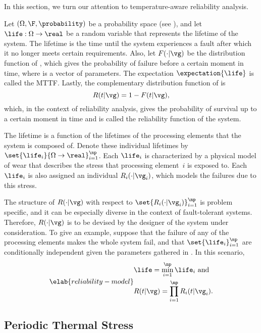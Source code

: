 In this section, we turn our attention to temperature-aware reliability
analysis.

Let $(\Omega, \F, \probability)$ be a probability space (see
), and let $\life: \Omega \to \real$ be a random
variable that represents the lifetime of the system. The lifetime is the time
until the system experiences a fault after which it no longer meets certain
requirements. Also, let $F(\cdot | \vg)$ be the distribution function of \life,
which gives the probability of failure before a certain moment in time, where
\vg is a vector of parameters. The expectation $\expectation{\life}$ is called
the \ac{MTTF}. Lastly, the complementary distribution function of \life is
\[
  R(t | \vg) = 1 - F(t | \vg),
\]
which, in the context of reliability analysis, gives the probability of survival
up to a certain moment in time and is called the reliability function of the
system.

The lifetime \life is a function of the lifetimes of the \np processing elements
that the system is composed of. Denote these individual lifetimes by
$\set{\life_i}{\Omega \to \real}_{i = 1}^\np$. Each $\life_i$ is characterized
by a physical model of wear \cite{jedec2016} that describes the stress that
processing element~$i$ is exposed to. Each $\life_i$ is also assigned an
individual $R_i(\cdot | \vg_i)$, which models the failures due to this stress.

The structure of $R(\cdot | \vg)$ with respect to $\set{R_i(\cdot | \vg_i)}_{i =
1}^\np$ is problem specific, and it can be especially diverse in the context of
fault-tolerant systems. Therefore, $R(\cdot | \vg)$ is to be devised by the
designer of the system under consideration. To give an example, suppose that the
failure of any of the \np processing elements makes the whole system fail, and
that $\set{\life_i}_{i = 1}^\np$ are conditionally independent given the
parameters gathered in \vg. In this scenario,
\begin{equation} \elab{reliability-model}
  \begin{split}
    & \life = \min_{i = 1}^\np \life_i \text{ and} \\
    & R(t | \vg) = \prod_{i = 1}^\np R_i(t | \vg_i).
  \end{split}
\end{equation}

\subsection{Periodic Thermal Stress}

